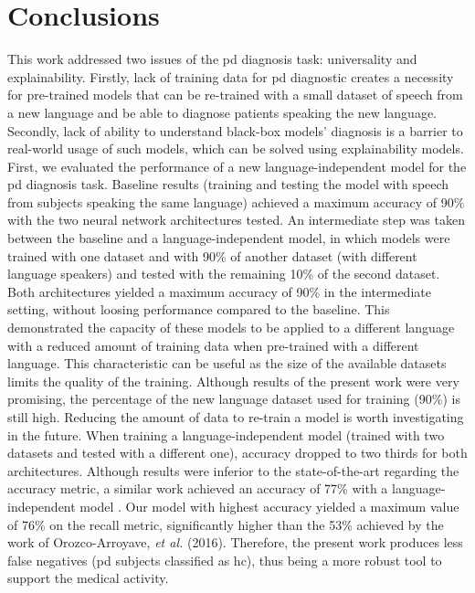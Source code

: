 
\chapter{Conclusions}
\label{ch:magna}


This work addressed two issues of the \gls{pd} diagnosis task: universality and explainability. Firstly, lack of training data for \gls{pd} diagnostic creates a necessity for pre-trained models that can be re-trained with a small dataset of speech from a new language and be able to diagnose patients speaking the new language. Secondly, lack of ability to understand black-box models' diagnosis is a barrier to real-world usage of such models, which can be solved using explainability models. \\
First, we evaluated the performance of a new language-independent model for the \gls{pd} diagnosis task. Baseline results (training and testing the model with speech from subjects speaking the same language) achieved a maximum accuracy of 90\% with the two neural network architectures tested. An intermediate step was taken between the baseline and a language-independent model, in which models were trained with one dataset and with 90\% of another dataset (with different language speakers) and tested with the remaining 10\% of the second dataset. Both architectures yielded a maximum accuracy of 90\% in the intermediate setting, without loosing performance compared to the baseline. This demonstrated the capacity of these models to be applied to a different language with a reduced amount of training data when pre-trained with a different language. This characteristic can be useful as the size of the available datasets limits the quality of the training. Although results of the present work were very promising, the percentage of the new language dataset used for training (90\%) is still high. Reducing the amount of data to re-train a model is worth investigating in the future. When training a language-independent model (trained with two datasets and tested with a different one), accuracy dropped to two thirds for both architectures. Although results were inferior to the state-of-the-art regarding the accuracy metric, a similar work achieved an accuracy of 77\% with a language-independent model \cite{parkinson_three_languages}. Our model with highest accuracy yielded a maximum value of 76\% on the recall metric, significantly higher than the 53\% achieved by the work of Orozco-Arroyave, \textit{et al.} (2016). Therefore, the present work produces less false negatives (\gls{pd} subjects classified as \gls{hc}), thus being a more robust tool to support the medical activity. \\
